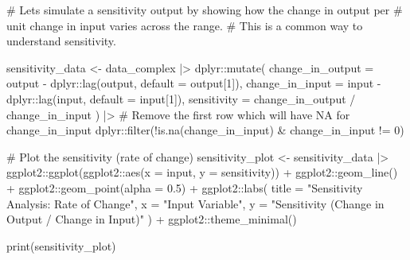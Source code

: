\documentclass[
  10pt,
  letterpaper,
  DIV=11,
  numbers=noendperiod]{scrartcl}
\newenvironment{Shaded}{\begin{snugshade}}{\end{snugshade}}
\newcommand{\AttributeTok}[1]{\textcolor[rgb]{0.40,0.45,0.13}{#1}}
\newcommand{\CommentTok}[1]{\textcolor[rgb]{0.37,0.37,0.37}{#1}}
\newcommand{\DecValTok}[1]{\textcolor[rgb]{0.68,0.00,0.00}{#1}}
\newcommand{\FloatTok}[1]{\textcolor[rgb]{0.68,0.00,0.00}{#1}}
\newcommand{\FunctionTok}[1]{\textcolor[rgb]{0.28,0.35,0.67}{#1}}
\newcommand{\NormalTok}[1]{\textcolor[rgb]{0.00,0.23,0.31}{#1}}
\newcommand{\OtherTok}[1]{\textcolor[rgb]{0.00,0.23,0.31}{#1}}
\newcommand{\SpecialCharTok}[1]{\textcolor[rgb]{0.37,0.37,0.37}{#1}}
\newcommand{\StringTok}[1]{\textcolor[rgb]{0.13,0.47,0.30}{#1}}
\begin{document}
\begin{Shaded}
\begin{Highlighting}[]
\CommentTok{\# Let\textquotesingle{}s simulate a \textquotesingle{}sensitivity\textquotesingle{} output by showing how the change in output per}
\CommentTok{\# unit change in input varies across the range.}
\CommentTok{\# This is a common way to understand sensitivity.}

\NormalTok{sensitivity\_data }\OtherTok{\textless{}{-}}\NormalTok{ data\_complex }\SpecialCharTok{|\textgreater{}}
\NormalTok{  dplyr}\SpecialCharTok{::}\FunctionTok{mutate}\NormalTok{(}
    \AttributeTok{change\_in\_output =}\NormalTok{ output }\SpecialCharTok{{-}}\NormalTok{ dplyr}\SpecialCharTok{::}\FunctionTok{lag}\NormalTok{(output, }\AttributeTok{default =}\NormalTok{ output[}\DecValTok{1}\NormalTok{]),}
    \AttributeTok{change\_in\_input =}\NormalTok{ input }\SpecialCharTok{{-}}\NormalTok{ dplyr}\SpecialCharTok{::}\FunctionTok{lag}\NormalTok{(input, }\AttributeTok{default =}\NormalTok{ input[}\DecValTok{1}\NormalTok{]),}
    \AttributeTok{sensitivity =}\NormalTok{ change\_in\_output }\SpecialCharTok{/}\NormalTok{ change\_in\_input}
\NormalTok{  ) }\SpecialCharTok{|\textgreater{}}
  \CommentTok{\# Remove the first row which will have NA for change\_in\_input}
\NormalTok{  dplyr}\SpecialCharTok{::}\FunctionTok{filter}\NormalTok{(}\SpecialCharTok{!}\FunctionTok{is.na}\NormalTok{(change\_in\_input) }\SpecialCharTok{\&}\NormalTok{ change\_in\_input }\SpecialCharTok{!=} \DecValTok{0}\NormalTok{)}

\CommentTok{\# Plot the sensitivity (rate of change)}
\NormalTok{sensitivity\_plot }\OtherTok{\textless{}{-}}\NormalTok{ sensitivity\_data }\SpecialCharTok{|\textgreater{}}
\NormalTok{  ggplot2}\SpecialCharTok{::}\FunctionTok{ggplot}\NormalTok{(ggplot2}\SpecialCharTok{::}\FunctionTok{aes}\NormalTok{(}\AttributeTok{x =}\NormalTok{ input, }\AttributeTok{y =}\NormalTok{ sensitivity)) }\SpecialCharTok{+}
\NormalTok{  ggplot2}\SpecialCharTok{::}\FunctionTok{geom\_line}\NormalTok{() }\SpecialCharTok{+}
\NormalTok{  ggplot2}\SpecialCharTok{::}\FunctionTok{geom\_point}\NormalTok{(}\AttributeTok{alpha =} \FloatTok{0.5}\NormalTok{) }\SpecialCharTok{+}
\NormalTok{  ggplot2}\SpecialCharTok{::}\FunctionTok{labs}\NormalTok{(}
    \AttributeTok{title =} \StringTok{"Sensitivity Analysis: Rate of Change"}\NormalTok{,}
    \AttributeTok{x =} \StringTok{"Input Variable"}\NormalTok{,}
    \AttributeTok{y =} \StringTok{"Sensitivity (Change in Output / Change in Input)"}
\NormalTok{  ) }\SpecialCharTok{+}
\NormalTok{  ggplot2}\SpecialCharTok{::}\FunctionTok{theme\_minimal}\NormalTok{()}

\FunctionTok{print}\NormalTok{(sensitivity\_plot)}
\end{Highlighting}
\end{Shaded}
\end{document}
